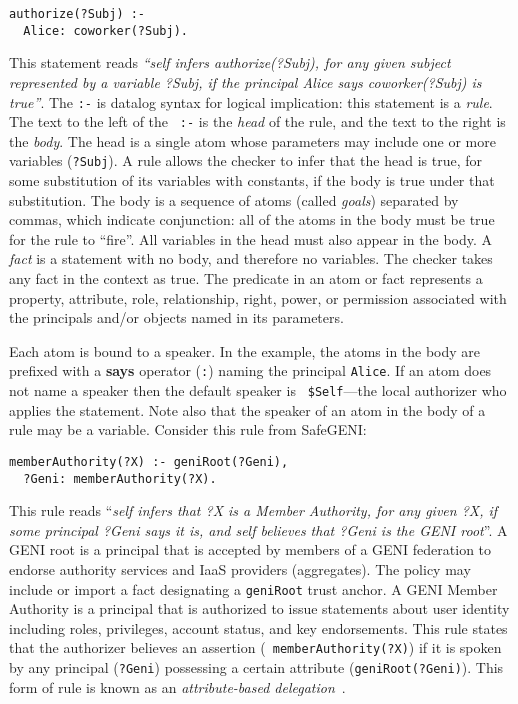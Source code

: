 \begin{verbatim}
authorize(?Subj) :- 
  Alice: coworker(?Subj).
\end{verbatim}

This statement reads {\it ``self infers authorize(?Subj), for any given subject
represented by a variable ?Subj, if the principal Alice says
coworker(?Subj) is true''}.   The {\tt :-} is datalog syntax for logical
implication: this statement is a {\it rule}.  The text to the left of the {\tt
:-} is the {\it head} of the rule, and the text to the right is the {\it body}.
The head is a single atom whose parameters may include one or more variables
({\tt ?Subj}).  A rule allows the checker to infer that the head is true,
for some substitution of its variables with constants, if the body is true
under that substitution.  The body is a sequence of atoms (called {\it goals})
separated by commas, which indicate conjunction: all of the atoms in the body
must be true for the rule to ``fire''. All variables in the head must also
appear in the body. A {\it fact} is a statement with no body, and therefore no
variables. The checker takes any fact in the context as true.  The predicate in
an atom or fact represents a property, attribute, role, relationship, right,
power, or permission associated with the principals and/or objects named in its
parameters.

Each atom is bound to a speaker. In the example, the atoms in the body are
prefixed with a {\bf says} operator ({\tt :}) naming the principal {\tt Alice}.
If an atom does not name a speaker then the default speaker is {\tt
\$Self}---the local authorizer who applies the statement. Note also that the
speaker of an atom in the body of a rule may be a variable. Consider this rule
from SafeGENI:

\begin{verbatim}
memberAuthority(?X) :- geniRoot(?Geni),
  ?Geni: memberAuthority(?X).
\end{verbatim}

This rule reads ``{\it self infers that ?X is a Member Authority, for any given
?X, if some principal ?Geni says it is, and self believes that ?Geni is the
GENI root}''. A GENI root is a principal that is accepted by members of a GENI
federation to endorse authority services and IaaS providers (aggregates).  The
policy may include or import a fact designating a {\tt geniRoot} trust anchor.
A GENI Member Authority is a principal that is authorized to issue statements
about user identity including roles, privileges, account status, and key
endorsements.  This rule states that the authorizer believes an assertion ({\tt
memberAuthority(?X)}) if it is spoken by any principal ({\tt ?Geni}) possessing
a certain attribute ({\tt geniRoot(?Geni)}).  This form of rule is known as an
{\it attribute-based delegation}~\cite{rt-abac}.




